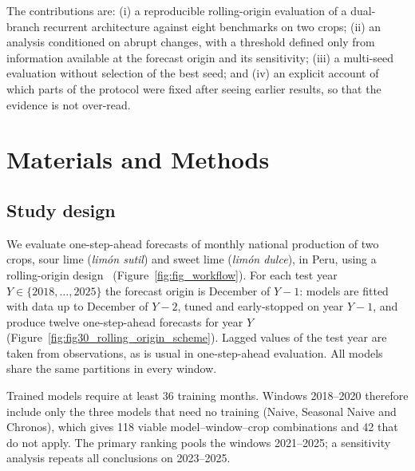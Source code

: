 \documentclass[forecasting,article,submit,moreauthors]{Definitions/mdpi}
\newcommand{\pendiente}[1]{\textcolor{red}{[PENDIENTE: #1]}}
\begin{document}
The contributions are: (i) a reproducible rolling-origin evaluation of a dual-branch recurrent architecture against eight benchmarks on two crops; (ii) an analysis conditioned on abrupt changes, with a threshold defined only from information available at the forecast origin and its sensitivity; (iii) a multi-seed evaluation without selection of the best seed; and (iv) an explicit account of which parts of the protocol were fixed after seeing earlier results, so that the evidence is not over-read.

\section{Materials and Methods}\label{sec:methods}

\subsection{Study design}
We evaluate one-step-ahead forecasts of monthly national production of two crops, sour lime (\textit{lim\'on sutil}) and sweet lime (\textit{lim\'on dulce}), in Peru, using a rolling-origin design~\cite{tashman2000out} (Figure~\ref{fig:fig_workflow}). For each test year $Y\in\{2018,\dots,2025\}$ the forecast origin is December of $Y-1$: models are fitted with data up to December of $Y-2$, tuned and early-stopped on year $Y-1$, and produce twelve one-step-ahead forecasts for year $Y$ (Figure~\ref{fig:fig30_rolling_origin_scheme}). Lagged values of the test year are taken from observations, as is usual in one-step-ahead evaluation. All models share the same partitions in every window.

Trained models require at least 36 training months. Windows 2018--2020 therefore include only the three models that need no training (Naive, Seasonal Naive and Chronos), which gives 118 viable model--window--crop combinations and 42 that do not apply. The primary ranking pools the windows 2021--2025; a sensitivity analysis repeats all conclusions on 2023--2025.
\end{document}
